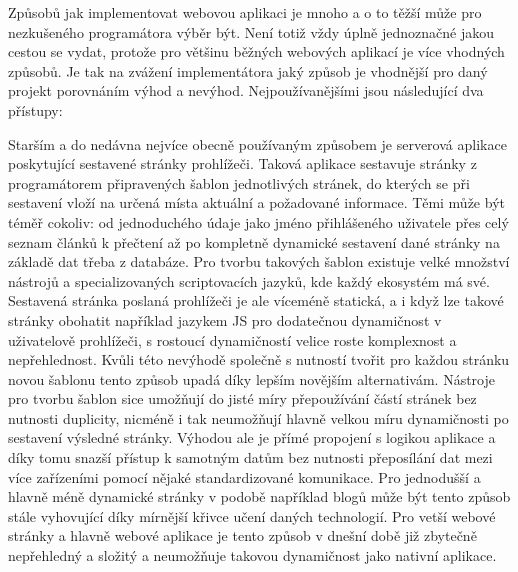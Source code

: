 	Způsobů jak implementovat webovou aplikaci je mnoho a o to těžší může pro nezkušeného programátora výběr být.
	Není totiž vždy úplně jednoznačné jakou cestou se vydat, protože pro většinu běžných webových aplikací je více
	vhodných způsobů.
	Je tak na zvážení implementátora jaký způsob je vhodnější pro daný projekt porovnáním výhod a nevýhod.
	Nejpoužívanějšími jsou následující dva přístupy:

	Starším a do nedávna nejvíce obecně používaným způsobem je serverová aplikace poskytující sestavené stránky
	prohlížeči.
	Taková aplikace sestavuje stránky z programátorem připravených šablon jednotlivých stránek, do kterých se při sestavení
	vloží na určená místa aktuální a požadované informace.
	Těmi může být téměř cokoliv: od jednoduchého údaje jako jméno přihlášeného uživatele přes celý seznam článků k přečtení
	až po kompletně dynamické sestavení dané stránky na základě dat třeba z databáze.
	Pro tvorbu takových šablon existuje velké množství nástrojů a specializovaných scriptovacích jazyků, kde každý
	ekosystém má své.
	Sestavená stránka poslaná prohlížeči je ale víceméně statická, a i když lze takové stránky obohatit například jazykem
	\ac{JS} pro dodatečnou dynamičnost v uživatelově prohlížeči, s rostoucí dynamičností velice roste komplexnost a nepřehlednost.
	Kvůli této nevýhodě společně s nutností tvořit pro každou stránku novou šablonu tento způsob upadá díky lepším novějším
	alternativám.
	Nástroje pro tvorbu šablon sice umožňují do jisté míry přepoužívání částí stránek bez nutnosti duplicity,
	nicméně i tak neumožňují hlavně velkou míru dynamičnosti po sestavení výsledné stránky.
	Výhodou ale je přímé propojení s logikou aplikace a díky tomu snazší přístup k samotným datům bez nutnosti přeposílání
	dat mezi více zařízeními pomocí nějaké standardizované komunikace.
	Pro jednodušší a hlavně méně dynamické stránky v podobě například blogů může být tento způsob stále vyhovující díky
	mírnější křivce učení daných technologií.
	Pro vetší webové stránky a hlavně webové aplikace je tento způsob v dnešní době již zbytečně nepřehledný a složitý a
	neumožňuje takovou dynamičnost jako nativní aplikace.

